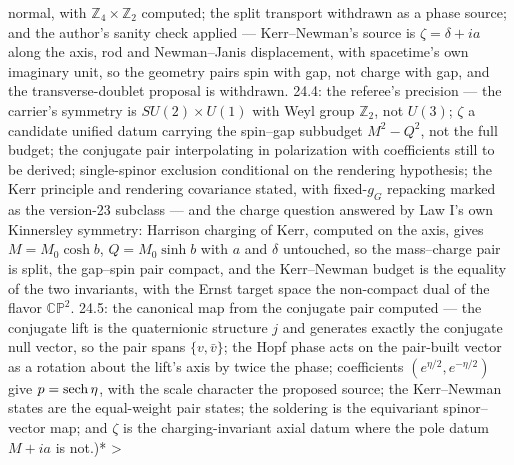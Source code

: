 normal, with $\mathbb Z_4\times\mathbb Z_2$ computed; the split transport withdrawn as a phase source; and the author's sanity check applied — Kerr–Newman's source is $\zeta = \delta+ia$ along the axis, rod and Newman–Janis displacement, with spacetime's own imaginary unit, so the geometry pairs spin with gap, not charge with gap, and the transverse-doublet proposal is withdrawn. 24.4: the referee's precision — the carrier's symmetry is $SU(2)\times U(1)$ with Weyl group $\mathbb Z_2$, not $U(3)$; $\zeta$ a candidate unified datum carrying the spin–gap subbudget $M^2-Q^2$, not the full budget; the conjugate pair interpolating in polarization with coefficients still to be derived; single-spinor exclusion conditional on the rendering hypothesis; the Kerr principle and rendering covariance stated, with fixed-$g_G$ repacking marked as the version-23 subclass — and the charge question answered by Law I's own Kinnersley symmetry: Harrison charging of Kerr, computed on the axis, gives $M = M_0\cosh b$, $Q = M_0\sinh b$ with $a$ and $\delta$ untouched, so the mass–charge pair is split, the gap–spin pair compact, and the Kerr–Newman budget is the equality of the two invariants, with the Ernst target space the non-compact dual of the flavor $\mathbb{CP}^2$. 24.5: the canonical map from the conjugate pair computed — the conjugate lift is the quaternionic structure $j$ and generates exactly the conjugate null vector, so the pair spans $\{v,\bar v\}$; the Hopf phase acts on the pair-built vector as a rotation about the lift's axis by twice the phase; coefficients $(e^{\eta/2},e^{-\eta/2})$ give $p = {\rm sech}\,\eta$, with the scale character the proposed source; the Kerr–Newman states are the equal-weight pair states; the soldering is the equivariant spinor–vector map; and $\zeta$ is the charging-invariant axial datum where the pole datum $M+ia$ is not.)*
>
